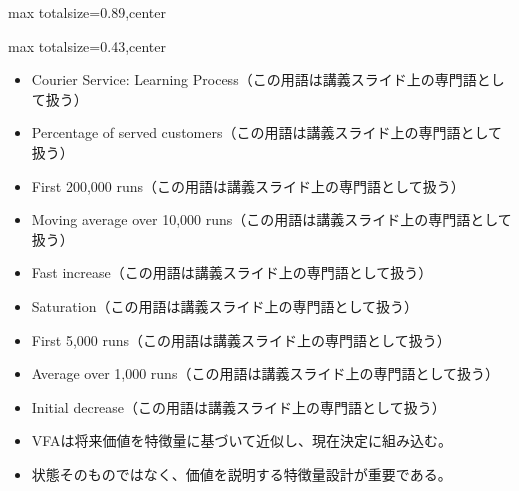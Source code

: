 \begin{minipage}[t]{0.58\textwidth}
\begin{adjustbox}{max totalsize={\textwidth}{0.89\textheight},center}
\begin{minipage}{\textwidth}
\end{minipage}
\end{adjustbox}
\end{minipage}


\clearpage
{}
\begin{minipage}[t]{0.405\textwidth}
\begin{adjustbox}{max totalsize={\textwidth}{0.43\textheight},center}
\begin{minipage}{\textwidth}\scriptsize
{}\begin{itemize}
\item Courier Service: Learning Process（この用語は講義スライド上の専門語として扱う）
\item Percentage of served customers（この用語は講義スライド上の専門語として扱う）
\item First 200,000 runs（この用語は講義スライド上の専門語として扱う）
\item Moving average over 10,000 runs（この用語は講義スライド上の専門語として扱う）
\item Fast increase（この用語は講義スライド上の専門語として扱う）
\item Saturation（この用語は講義スライド上の専門語として扱う）
\item First 5,000 runs（この用語は講義スライド上の専門語として扱う）
\item Average over 1,000 runs（この用語は講義スライド上の専門語として扱う）
\item Initial decrease（この用語は講義スライド上の専門語として扱う）
\end{itemize}\begin{itemize}
\item VFAは将来価値を特徴量に基づいて近似し、現在決定に組み込む。
\item 状態そのものではなく、価値を説明する特徴量設計が重要である。
\end{itemize}
\end{minipage}
\end{adjustbox}
\end{minipage}\hfill
